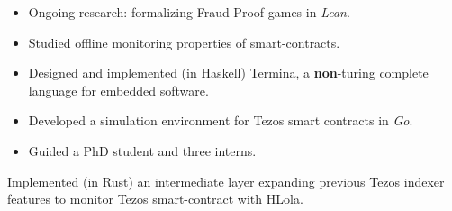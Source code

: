 
    \begin{itemize}
        \item Ongoing research: formalizing Fraud Proof games in \emph{Lean}.
        \item Studied offline monitoring properties of smart-contracts.
        \item Designed and implemented (in Haskell) Termina, a
            \textbf{non}-turing complete language for embedded software.
        \item Developed a simulation environment for Tezos smart contracts in \emph{Go}.
        \item Guided a PhD student and three interns.
    \end{itemize}

    \divider

        Implemented (in Rust) an intermediate layer expanding previous
            Tezos indexer features to monitor Tezos smart-contract with HLola.

    \divider

